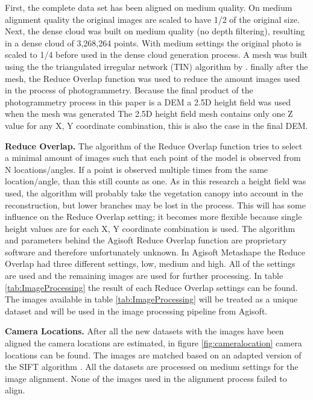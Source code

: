 \documentclass{isprs} %
\begin{document}
First, the complete data set has been aligned on medium quality.
On medium alignment quality the original images are scaled to have 1/2 of the original size.
Next, the dense cloud was built on medium quality (no depth filtering), resulting in a dense cloud of 3,268,264 points.
With medium settings the original photo is scaled to 1/4 before used in the dense cloud generation process.
A mesh was built using the the triangulated irregular network (TIN) algorithm by \citet{axelsson1999processing}. 
finally after the mesh, the Reduce Overlap function was used to reduce the amount images used in the process of photogrammetry. 
Because the final product of the photogrammetry process in this paper is a DEM a 2.5D height field was used when the mesh was generated
The 2.5D height field mesh contains only one Z value for any X, Y coordinate combination, this is also the case in the final DEM.


\textbf{Reduce Overlap.} 
The algorithm of the Reduce Overlap function tries to select a minimal amount of images such that each point of the model is observed from N locations/angles.
If a point is observed multiple times from the same location/angle, than this still counts as one. 
As in this research a height field was used, the algorithm will probably take the vegetation canopy into account in the reconstruction, but lower branches may be lost in the process.
This will has some influence on the Reduce Overlap setting; it becomes more flexible because single height values are for each X, Y coordinate combination is used.
The algorithm and parameters behind the Agisoft Reduce Overlap function are proprietary software and therefore unfortunately unknown.
In Agisoft Metashape the Reduce Overlap had three different settings, low, medium and high. 
All of the settings are used and the remaining images are used for further processing.
In table \ref{tab:ImageProcessing} the result of each Reduce Overlap settings can be found.
The images available in table \ref{tab:ImageProcessing} will be treated as a unique dataset and will be used in the image processing pipeline from Agisoft.

\textbf{Camera Locations.}
After all the new datasets with the images have been aligned the camera locations are estimated, in figure \ref{fig:cameralocation} camera locations can be found. 
The images are matched based on an adapted version of the SIFT algorithm \citep{lowe1999object, AgisoftMetashape}.
All the datasets are processed on medium settings for the image alignment.
None of the images used in the alignment process failed to align.
\end{document}
